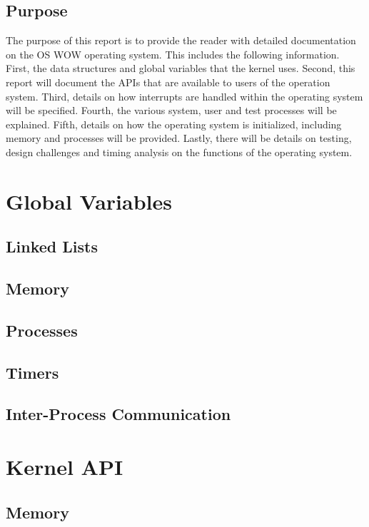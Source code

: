 \documentclass[se]{uw-wkrpt}
\begin{document}
\subsection{Purpose}

The purpose of this report is to provide the reader with detailed documentation on the OS WOW operating system. This includes the following information. First, the data structures and global variables that the kernel uses. Second, this report will document the APIs that are available to users of the operation system. Third, details on how interrupts are handled within the operating system will be specified. Fourth, the various system, user and test processes will be explained. Fifth, details on how the operating system is initialized, including memory and processes will be provided. Lastly, there will be details on testing, design challenges and timing analysis on the functions of the operating system.

\section{Global Variables}\label{sec:global}

\subsection{Linked Lists}

\subsection{Memory}

\subsection{Processes}

\subsection{Timers}

\subsection{Inter-Process Communication}

\section{Kernel API} \label{sec:kernel}

\subsection{Memory}
\end{document}
